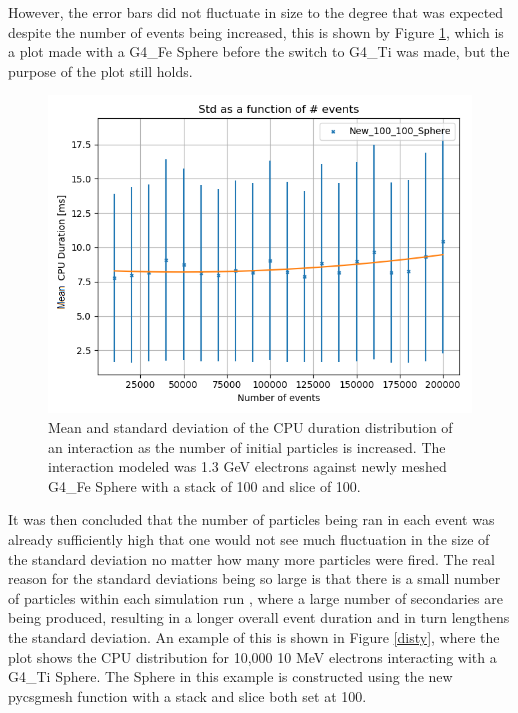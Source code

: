 \documentclass[12pt,a4paper]{article}
\begin{document}
\noindent However, the error bars did not fluctuate in size to the degree that was expected despite the number of events being increased, this is shown by Figure \ref{err}, which is a plot made with a G4\_Fe Sphere before the switch to G4\_Ti was made, but the purpose of the plot still holds. 

\begin{figure}[h!]
\centering
\includegraphics[scale=0.6]{Images//Error//std_N1.png}
\caption[width=\columnwidth]{Mean and standard deviation of the CPU duration distribution of an interaction as the number of initial particles is increased. The interaction modeled was 1.3 GeV electrons against newly meshed G4\_Fe Sphere with a stack of 100 and slice of 100.}
\label{err}
\end{figure}

\noindent It was then concluded that the number of particles being ran in each event was already sufficiently high that one would not see much fluctuation in the size of the standard deviation no matter how many more particles were fired. The real reason for the standard deviations being so large is that there is a small number of particles within each simulation run , where a large number of secondaries are being produced, resulting in a longer overall event duration and in turn lengthens the standard deviation. An example of this is shown in Figure \ref{disty}, where the plot shows the CPU distribution for 10,000 10 MeV electrons interacting with a G4\_Ti Sphere. The Sphere in this example is constructed using the new pycsgmesh function with a stack and slice both set at 100.
\end{document}
